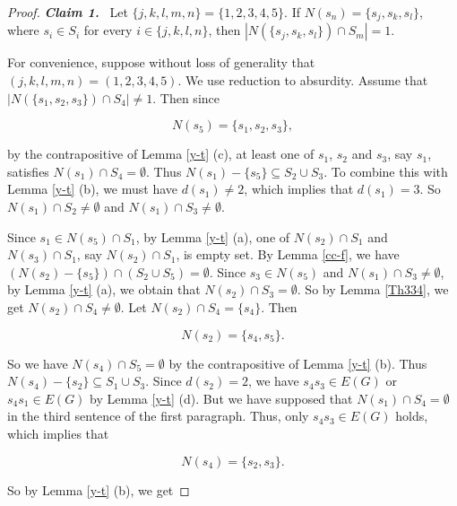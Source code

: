 \documentclass[a4paper,11pt]{article}
\numberwithin{equation}{section}
\begin{document}
\begin{proof}
\smallskip
\emph{\textbf{Claim 1.}}~ Let $\{j,k,l,m,n\}=\{1,2,3,4,5\}$. If $N(s_n)=\{s_j,s_k,s_l\}$, where $s_i\in S_i$ for every $i\in\{j,k,l,n\}$, then $|N(\{s_j,s_k,s_l\})\cap S_m|=1$.

For convenience, suppose without loss of generality that $(j,k,l,m,n)=(1,2,3,4,5)$.  We use reduction to absurdity. Assume that $|N(\{s_1,s_2,s_3\})\cap S_4|\neq1$.
Then since

\vspace{-12pt}
\begin{equation*}
N(s_5)=\{s_1,s_2,s_3\},
\end{equation*}

 \noindent by the contrapositive of Lemma \ref{y-t} (c), at least one of $s_1$, $s_2$ and $s_3$, say $s_1$, satisfies $N(s_1)\cap S_4=\emptyset$. Thus $N(s_1)-\{s_5\}\subseteq S_2\cup S_3$. To combine this with Lemma \ref{y-t} (b), we must have $d(s_1)\neq 2$, which implies that $d(s_1)=3$. So $N(s_1)\cap S_2\neq\emptyset$ and $N(s_1)\cap S_3\neq\emptyset$.

Since $s_1\in N(s_5)\cap S_1$, by Lemma \ref{y-t} (a), one of $N(s_2)\cap S_1$ and $N(s_3)\cap S_1$, say $N(s_2)\cap S_1$, is empty set. By Lemma \ref{cc-f}, we have $(N(s_2)-\{s_5\})\cap (S_2\cup S_5)=\emptyset$.  Since $s_3\in N(s_5)$ and $N(s_1)\cap S_3\neq\emptyset$, by Lemma \ref{y-t} (a), we obtain that $N(s_2)\cap S_3=\emptyset$. So by Lemma \ref{Th334}, we get $N(s_2)\cap S_4\neq\emptyset$. Let $N(s_2)\cap S_4=\{s_4\}$. Then


\vspace{-13.5pt}
\begin{equation*}
N(s_2)=\{s_4,s_5\}.
\end{equation*}

\vspace{-1pt}
\noindent So we have $N(s_4)\cap  S_5=\emptyset$ by the contrapositive of Lemma \ref{y-t} (b). Thus $N(s_4)-\{s_2\}\subseteq S_1\cup S_3$. Since $d(s_2)=2$, we have $s_4s_3\in E(G)$ or $s_4s_1\in E(G)$ by Lemma \ref{y-t} (d). But we have supposed that $N(s_1)\cap S_4=\emptyset$ in the third sentence of the first paragraph. Thus, only $s_4s_3\in E(G)$ holds, which implies that


\vspace{-25pt}
\begin{equation*}
N(s_4)=\{s_2,s_3\}.
\end{equation*}

\vspace{-4pt}
\noindent  So by Lemma \ref{y-t} (b), we get


\end{proof}
\end{document}
